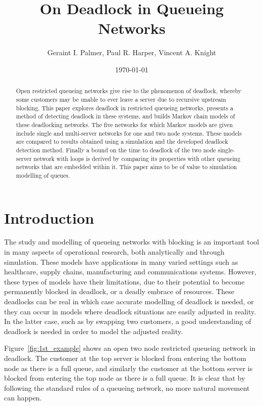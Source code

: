 \documentclass{article}
\title{On Deadlock in Queueing Networks}
\author{Geraint I. Palmer, Paul R. Harper, Vincent A. Knight}
\date{\today}
\numberwithin{equation}{section}
\begin{document}
\onehalfspacing

\maketitle


\begin{abstract}
Open restricted queueing networks give rise to the phenomenon of deadlock, whereby some customers may be unable to ever leave a server due to recursive upstream blocking.
This paper explores deadlock in restricted queueing networks, presents a method of detecting deadlock in these systems, and builds Markov chain models of these deadlocking networks.
The five networks for which Markov models are given include single and multi-server networks for one and two node systems.
These models are compared to results obtained using a simulation and the developed deadlock detection method.
Finally a bound on the time to deadlock of the two node single-server network with loops is derived by comparing its properties with other queueing networks that are embedded within it.
This paper aims to be of value to simulation modelling of queues.
\end{abstract}

\section{Introduction}

The study and modelling of queueing networks with blocking is an important tool in many aspects of operational research, both analytically and through simulation.
These models have applications in many varied settings such as healthcare, supply chains, manufacturing and communications systems.
However, these types of models have their limitations, due to their potential to become permanently blocked in deadlock, or a deadly embrace of resources.
These deadlocks can be real in which case accurate modelling of deadlock is needed, or they can occur in models where deadlock situations are easily adjusted in reality. In the latter case, such as by swapping two customers, a good understanding of deadlock is needed in order to model the adjusted reality.

Figure~\ref{fig:1st_example} shows an open two node restricted queueing network in deadlock.
The customer at the top server is blocked from entering the bottom node as there is a full queue, and similarly the customer at the bottom server is blocked from entering the top node as there is a full queue.
It is clear that by following the standard rules of a queueing network, no more natural movement can happen.
\end{document}
